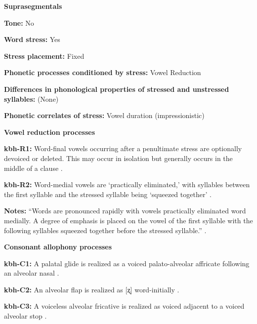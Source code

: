 \textbf{Suprasegmentals}



\textbf{Tone:} No



\textbf{Word stress:} Yes



\textbf{Stress placement:} Fixed



\textbf{Phonetic processes conditioned by stress:} Vowel Reduction



\textbf{Differences in phonological properties of stressed and unstressed syllables:} (None)



\textbf{Phonetic correlates of stress:} Vowel duration (impressionistic)



\textbf{Vowel reduction processes}



\textbf{kbh-R1:} Word-final vowels occurring after a penultimate stress are optionally devoiced or deleted. This may occur in isolation but generally occurs in the middle of a clause \citep[86]{Howard1967}.



\textbf{kbh-R2:} Word-medial vowels are ‘practically eliminated,’ with syllables between the first syllable and the stressed syllable being ‘squeezed together’ \citep[86-7]{Howard1967}.



\textbf{Notes:} “Words are pronounced rapidly with vowels practically eliminated word medially. A degree of emphasis is placed on the vowel of the first syllable with the following syllables squeezed together before the stressed syllable.” \citep[86-7]{Howard1967}.



\textbf{Consonant allophony processes}



\textbf{kbh-C1:} A palatal glide is realized as a voiced palato-alveolar affricate following an alveolar nasal \citep{Howard1967}.



\textbf{kbh-C2:} An alveolar flap is realized as [ʐ] word-initially \citep[78]{Howard1967}.



\textbf{kbh-C3:} A voiceless alveolar fricative is realized as voiced adjacent to a voiced alveolar stop \citep[78]{Howard1967}.



